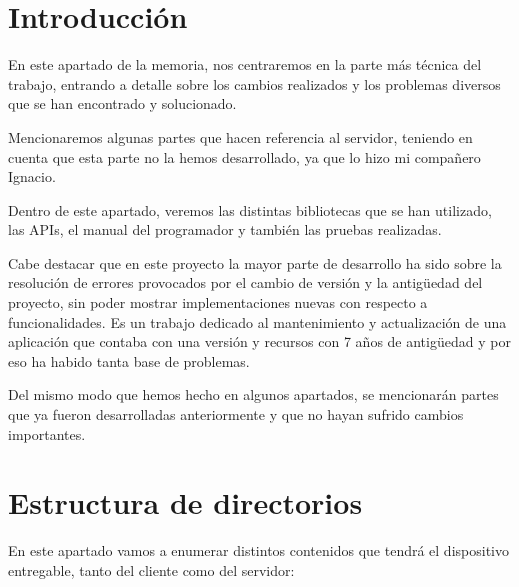 
\section{Introducción}

En este apartado de la memoria, nos centraremos en la parte más técnica del trabajo, entrando a detalle sobre los cambios realizados y los problemas diversos que se han encontrado y solucionado.

Mencionaremos algunas partes que hacen referencia al servidor, teniendo en cuenta que esta parte no la hemos desarrollado, ya que lo hizo mi compañero Ignacio.

Dentro de este apartado, veremos las distintas bibliotecas que se han utilizado, las APIs, el manual del programador y también las pruebas realizadas. 

Cabe destacar que en este proyecto la mayor parte de desarrollo ha sido sobre la resolución de errores provocados por el cambio de versión y la antigüedad del proyecto, sin poder mostrar implementaciones nuevas con respecto a funcionalidades. Es un trabajo dedicado al mantenimiento y actualización de una aplicación que contaba con una versión y recursos con 7 años de antigüedad y por eso ha habido tanta base de problemas.

Del mismo modo que hemos hecho en algunos apartados, se mencionarán partes que ya fueron desarrolladas anteriormente y que no hayan sufrido cambios importantes.

\section{Estructura de directorios}

En este apartado vamos a enumerar distintos contenidos que tendrá el dispositivo entregable, tanto del cliente como del servidor:

